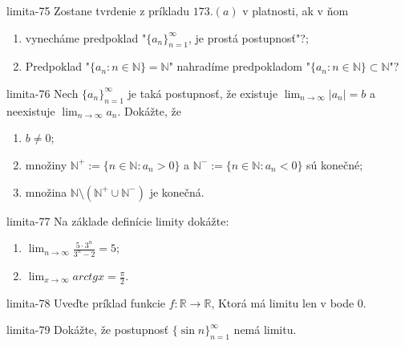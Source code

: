 \begin{defproblem}{limita-75}
Zostane tvrdenie z príkladu $173.(a)$  v platnosti, ak v ňom
\begin{enumerate}
\item vynecháme predpoklad "${\{a_n\}}_{n=1}^\infty$, je prostá postupnosť"?;
\item Predpoklad "$\{a_n: n \in \mathbb{N}\}=\mathbb{N}$" nahradíme predpokladom "$\{a_n: n \in \mathbb{N}\} \subset \mathbb{N}$"?
\end{enumerate}
\end{defproblem}

\begin{defproblem}{limita-76}
Nech ${\{a_n\}}_{n=1}^\infty$ je taká postupnosť, že existuje $\lim_{n \rightarrow \infty} |a_n|=b$ a neexistuje $\lim_{n \rightarrow \infty} a_n$. Dokážte, že
\begin{enumerate}
\item $b \neq 0$;
\item množiny $\mathbb{N^+}:= \{n \in \mathbb{N}: a_n>0 \}$ a $\mathbb{N^-}:= \{n \in \mathbb{N}: a_n<0 \}$ sú konečné;
\item množina $\mathbb{N} \setminus (\mathbb{N^+} \cup \mathbb{N^-})$ je konečná.
\end{enumerate}
\end{defproblem}

\begin{defproblem}{limita-77}
Na základe definície limity dokážte:
\begin{multicols}{2}
\begin{enumerate}
    \item $\lim_{n \rightarrow \infty} \frac{5 \cdot 3^n}{3^n-2}=5$;
    \item $\lim_{x \rightarrow \infty} arctg x=\frac{\pi}{2}$.
\end{enumerate}
\end{multicols}
\end{defproblem}

\begin{defproblem}{limita-78}
Uveďte príklad funkcie $f: \mathbb{R} \rightarrow \mathbb{R}$, Ktorá má limitu len v bode $0$.
\end{defproblem}

\begin{defproblem}{limita-79}
Dokážte, že postupnosť ${\{\sin n\}}_{n=1}^\infty$ nemá limitu.
\end{defproblem}

